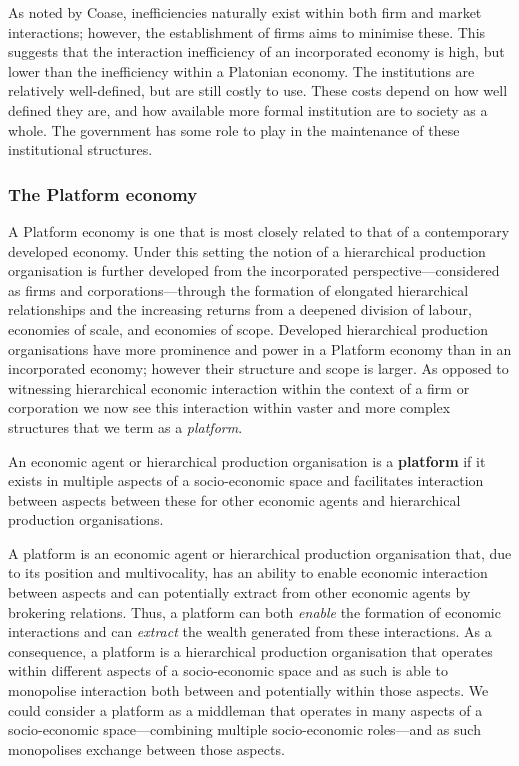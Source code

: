 As noted by Coase, inefficiencies naturally exist within both firm and market interactions; however, the establishment of firms aims to minimise these. This suggests that the interaction inefficiency of an incorporated economy is high, but lower than the inefficiency within a Platonian economy. The institutions are relatively well-defined, but are still costly to use. These costs depend on how well defined they are, and how available more formal institution are to society as a whole. The government has some role to play in the maintenance of these institutional structures.

\subsubsection{The Platform economy}

A Platform economy is one that is most closely related to that of a contemporary developed economy. Under this setting the notion of a hierarchical production organisation is further developed from the incorporated perspective---considered as firms and corporations---through the formation of elongated hierarchical relationships and the increasing returns from a deepened division of labour, economies of scale, and economies of scope. Developed hierarchical production organisations have more prominence and power in a Platform economy than in an incorporated economy; however their structure and scope is larger. As opposed to witnessing hierarchical economic interaction within the context of a firm or corporation we now see this interaction within vaster and more complex structures that we term as a \emph{platform}.
\begin{definition}[Platform] \label{def:platform}
An economic agent or hierarchical production organisation is a \textbf{platform} if it exists in multiple aspects of a socio-economic space and facilitates interaction between aspects between these for other economic agents and hierarchical production organisations.
\end{definition}
A platform is an economic agent or hierarchical production organisation that, due to its position and multivocality, has an ability to enable economic interaction between aspects and can potentially extract from other economic agents by brokering relations. Thus, a platform can both \emph{enable} the formation of economic interactions and can \emph{extract} the wealth generated from these interactions. As a consequence, a platform is a hierarchical production organisation that operates within different aspects of a socio-economic space and as such is able to monopolise interaction both between and potentially within those aspects. We could consider a platform as a middleman that operates in many aspects of a socio-economic space---combining multiple socio-economic roles---and as such monopolises exchange between those aspects.

